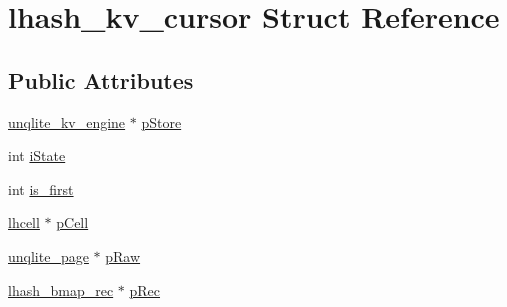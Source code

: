 \hypertarget{structlhash__kv__cursor}{\section{lhash\-\_\-kv\-\_\-cursor Struct Reference}
\label{df/d9a/structlhash__kv__cursor}
}
\subsection*{Public Attributes}
\begin{DoxyCompactItemize}
\item 
\hyperlink{structunqlite__kv__engine}{unqlite\-\_\-kv\-\_\-engine} $\ast$ \hyperlink{structlhash__kv__cursor_a75054f250da7990f95bbd5b74acb94be}{p\-Store}
\item 
int \hyperlink{structlhash__kv__cursor_a1292683496ee35e411813a6864018b2c}{i\-State}
\item 
int \hyperlink{structlhash__kv__cursor_acdefc26ab38be4acb643e7dd2e4d9a2a}{is\-\_\-first}
\item 
\hyperlink{structlhcell}{lhcell} $\ast$ \hyperlink{structlhash__kv__cursor_ae39744280f5ea0bcb1e9507a31736054}{p\-Cell}
\item 
\hyperlink{structunqlite__page}{unqlite\-\_\-page} $\ast$ \hyperlink{structlhash__kv__cursor_aa9d9982796d1dc07a38de540e6d39e7e}{p\-Raw}
\item 
\hyperlink{structlhash__bmap__rec}{lhash\-\_\-bmap\-\_\-rec} $\ast$ \hyperlink{structlhash__kv__cursor_ac8b98ae6cfe052d62c3a60e82c23518f}{p\-Rec}
\end{DoxyCompactItemize}


